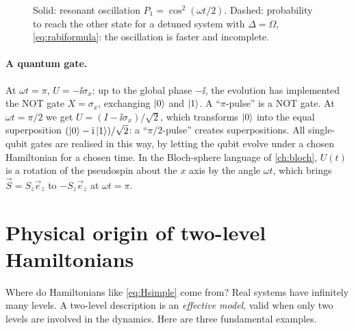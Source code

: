 \begin{figure}[h]\centering
{}
\caption{Solid: resonant oscillation $P_1=\cos^2(\omega t/2)$. Dashed: probability to reach the other state for a detuned
system with $\Delta=\Omega$, \cref{eq:rabiformula}: the oscillation is faster and incomplete.}\label{fig:rabi}
\end{figure}

\paragraph{A quantum gate.} At $\omega t=\pi$, $U=-\ii\sigma_x$: up to the global phase $-\ii$, the evolution has implemented the NOT gate
$X=\sigma_x$, exchanging $\left|0\right\rangle$ and $\left|1\right\rangle$. A ``$\pi$-pulse'' is a NOT gate. At $\omega t=\pi/2$ we get
$U=(I-\ii\sigma_x)/\sqrt2$, which transforms $\left|0\right\rangle$ into the equal superposition $(\left|0\right\rangle-\mathrm i\left|1\right\rangle)/\sqrt2$: a ``$\pi/2$-pulse'' creates
superpositions. All single-qubit gates are realised in this way, by letting the qubit evolve under a chosen Hamiltonian for a chosen
time. In the Bloch-sphere language of \cref{ch:bloch}, $U(t)$ is a rotation of the pseudospin about the $x$ axis by the angle $\omega t$,
which brings $\vec S=S_z\vec e_z$ to $-S_z\vec e_z$ at $\omega t=\pi$.

\section{Physical origin of two-level Hamiltonians}
Where do Hamiltonians like \cref{eq:Hsimple} come from? Real systems have infinitely many levels. A two-level description is an
\emph{effective model}, valid when only two levels are involved in the dynamics. Here are three fundamental examples.

